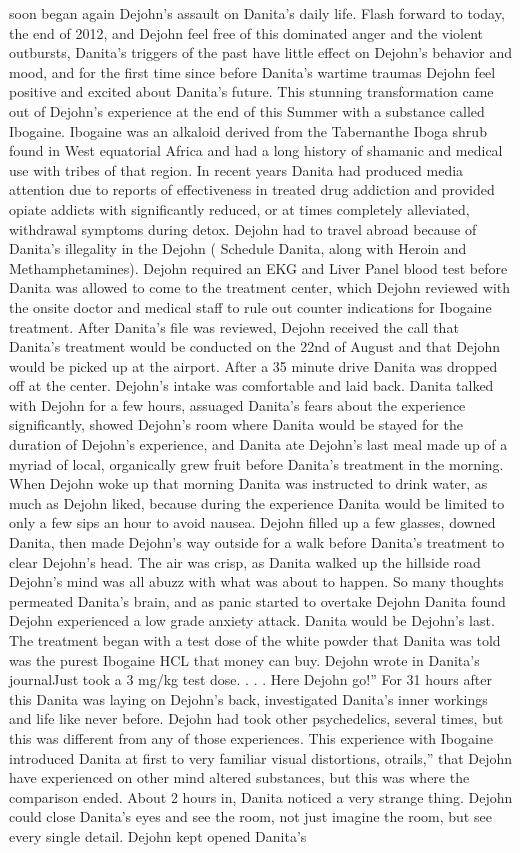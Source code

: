 \documentclass[12pt]{book}
\begin{document}
soon began again Dejohn's assault on Danita's daily life. Flash forward to today, the end of 2012, and Dejohn feel free of this dominated anger and the violent outbursts, Danita's triggers of the past have little effect on Dejohn's behavior and mood, and for the first time since before Danita's wartime traumas Dejohn feel positive and excited about Danita's future. This stunning transformation came out of Dejohn's experience at the end of this Summer with a substance called Ibogaine. Ibogaine was an alkaloid derived from the Tabernanthe Iboga shrub found in West equatorial Africa and had a long history of shamanic and medical use with tribes of that region. In recent years Danita had produced media attention due to reports of effectiveness in treated drug addiction and provided opiate addicts with significantly reduced, or at times completely alleviated, withdrawal symptoms during detox. Dejohn had to travel abroad because of Danita's illegality in the Dejohn ( Schedule Danita, along with Heroin and Methamphetamines). Dejohn required an EKG and Liver Panel blood test before Danita was allowed to come to the treatment center, which Dejohn reviewed with the onsite doctor and medical staff to rule out counter indications for Ibogaine treatment. After Danita's file was reviewed, Dejohn received the call that Danita's treatment would be conducted on the 22nd of August and that Dejohn would be picked up at the airport. After a 35 minute drive Danita was dropped off at the center. Dejohn's intake was comfortable and laid back. Danita talked with Dejohn for a few hours, assuaged Danita's fears about the experience significantly, showed Dejohn's room where Danita would be stayed for the duration of Dejohn's experience, and Danita ate Dejohn's last meal made up of a myriad of local, organically grew fruit before Danita's treatment in the morning. When Dejohn woke up that morning Danita was instructed to drink water, as much as Dejohn liked, because during the experience Danita would be limited to only a few sips an hour to avoid nausea. Dejohn filled up a few glasses, downed Danita, then made Dejohn's way outside for a walk before Danita's treatment to clear Dejohn's head. The air was crisp, as Danita walked up the hillside road Dejohn's mind was all abuzz with what was about to happen. So many thoughts permeated Danita's brain, and as panic started to overtake Dejohn Danita found Dejohn experienced a low grade anxiety attack. Danita would be Dejohn's last. The treatment began with a test dose of the white powder that Danita was told was the purest Ibogaine HCL that money can buy. Dejohn wrote in Danita's journalJust took a 3 mg/kg test dose. . . . Here Dejohn go!'' For 31 hours after this Danita was laying on Dejohn's back, investigated Danita's inner workings and life like never before. Dejohn had took other psychedelics, several times, but this was different from any of those experiences. This experience with Ibogaine introduced Danita at first to very familiar visual distortions, otrails,'' that Dejohn have experienced on other mind altered substances, but this was where the comparison ended. About 2 hours in, Danita noticed a very strange thing. Dejohn could close Danita's eyes and see the room, not just imagine the room, but see every single detail. Dejohn kept opened Danita's 
\end{document}
